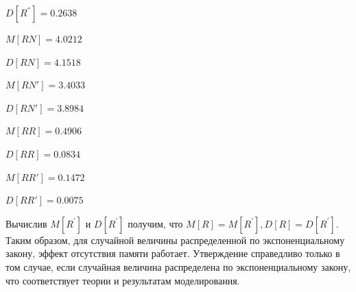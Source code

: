 $D[R^{''}]= 0.2638$


$M[RN]= 4.0212$

$D[RN]=4.1518$


$M[RN']= 3.4033$

$D[RN']= 3.8984$


$M[RR]= 0.4906$

$D[RR]= 0.0834$


$M[RR']= 0.1472$

$D[RR']= 0.0075$

Вычислив $M[R^{'}]$ и $D[R^{'}]$ получим,
что $M[R]=M[R^{'}],D[R]=D[R^{'}]$. Таким образом, для случайной величины распределенной по экспоненциальному
закону, эффект отсутствия памяти работает. Утверждение справедливо
только в том случае, если случайная величина распределена по экспоненциальному
закону, что соответствует теории и результатам моделирования. 

%
\newpage
